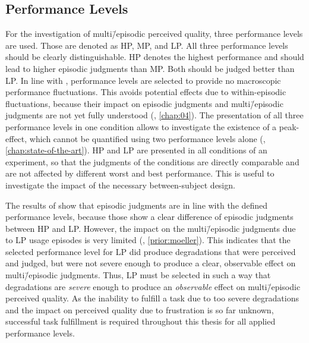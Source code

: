 \subsection{Performance Levels}
For the investigation of multi\=/episodic perceived quality, three performance levels are used.
Those are denoted as \acf{HP}, \acf{MP}, and \acf{LP}.
All three performance levels should be clearly distinguishable.
\ac{HP} denotes the highest performance and should lead to higher episodic judgments than \ac{MP}.
Both should be judged better than \ac{LP}.
In line with \citet{moller_single-call_2011}, performance levels are selected to provide no macroscopic performance fluctuations.
This avoids potential effects due to within-episodic fluctuations, because their impact on episodic judgments and multi\=/episodic judgments are not yet fully understood (\cf, \autoref{chap:04}).
The presentation of all three performance levels in one condition allows to investigate the existence of a peak-effect, which cannot be quantified using two performance levels alone (\cf, \autoref{chap:state-of-the-art}).
\ac{HP} and \ac{LP} are presented in all conditions of an experiment, so that the judgments of the conditions are directly comparable and are not affected by different worst and best performance.
This is useful to investigate the impact of the necessary between-subject design.

The results of \citet{moller_single-call_2011} show that episodic judgments are in line with the defined performance levels, because those show a clear difference of episodic judgments between \ac{HP} and \ac{LP}.
However, the impact on the multi\=/episodic judgments due to \ac{LP} usage episodes is very limited (\cf, \autoref{prior:moeller}).
This indicates that the selected performance level for \ac{LP} did produce degradations that were perceived and judged, but were not severe enough to produce a clear, observable effect on multi\=/episodic judgments.
Thus, \ac{LP} must be selected in such a way that degradations are \emph{severe} enough to produce an \emph{observable} effect on multi\=/episodic perceived quality.
As the inability to fulfill a task due to too severe degradations and the impact on perceived quality due to frustration is so far unknown, successful task fulfillment is required throughout this thesis for all applied performance levels.

